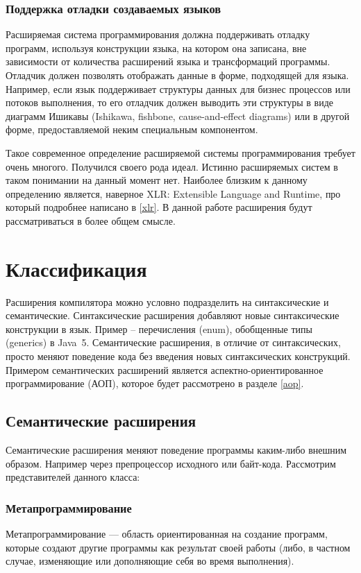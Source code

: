 \documentclass[a4paper,12pt]{article}
\begin{document}
\subsubsection*{Поддержка отладки создаваемых языков}
Расширяемая система программирования должна поддерживать отладку программ,
используя конструкции языка, на котором она записана, вне зависимости от
количества расширений языка и трансформаций программы. Отладчик должен
позволять отображать данные в форме, подходящей для языка. Например, если язык
поддерживает структуры данных для бизнес процессов или потоков выполнения, то
его отладчик должен выводить эти структуры в виде диаграмм Ишикавы
\cite{ishikawa} (Ishikawa, fishbone, cause-and-effect diagrams) или в другой
форме, предоставляемой неким специальным компонентом.

Такое современное определение расширяемой системы программирования требует
очень многого. Получился своего рода идеал. Истинно расширяемых систем в таком
понимании на данный момент нет. Наиболее близким к данному определению
является, наверное XLR: Extensible Language and Runtime, про который подробнее
написано в \ref{xlr}. В данной работе расширения будут рассматриваться в более
общем смысле.

\section{Классификация}
\label{clas}

Расширения компилятора можно условно подразделить на синтаксические и
семантические. Синтаксические расширения добавляют новые синтаксические
конструкции в язык. Пример -- перечисления (enum), обобщенные типы (generics) в
Java~5. Семантические расширения, в отличие от синтаксических, просто меняют
поведение кода без введения новых синтаксических конструкций. Примером
семантических расширений является аспектно-ориентированное программирование
(АОП), которое будет рассмотрено в разделе \ref{aop}.

\subsection{Семантические расширения}

Семантические расширения меняют поведение программы каким-либо внешним образом.
Например через препроцессор исходного или байт-кода.
Рассмотрим представителей данного класса:

\subsubsection*{Метапрограммирование}
Метапрограммирование — область ориентированная на создание программ, которые
создают другие программы как результат своей работы (либо, в частном случае,
изменяющие или дополняющие себя во время выполнения).
\end{document}
